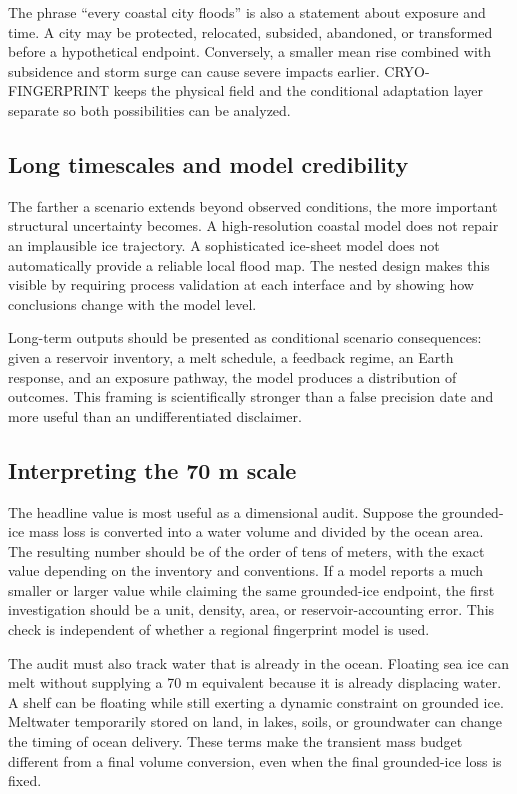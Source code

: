 \documentclass[conference]{IEEEtran}
\begin{document}
The phrase ``every coastal city floods'' is also a statement about exposure and time. A city may be protected, relocated, subsided, abandoned, or transformed before a hypothetical endpoint. Conversely, a smaller mean rise combined with subsidence and storm surge can cause severe impacts earlier. CRYO-FINGERPRINT keeps the physical field and the conditional adaptation layer separate so both possibilities can be analyzed.

\subsection{Long timescales and model credibility}

The farther a scenario extends beyond observed conditions, the more important structural uncertainty becomes. A high-resolution coastal model does not repair an implausible ice trajectory. A sophisticated ice-sheet model does not automatically provide a reliable local flood map. The nested design makes this visible by requiring process validation at each interface and by showing how conclusions change with the model level.

Long-term outputs should be presented as conditional scenario consequences: given a reservoir inventory, a melt schedule, a feedback regime, an Earth response, and an exposure pathway, the model produces a distribution of outcomes. This framing is scientifically stronger than a false precision date and more useful than an undifferentiated disclaimer.

\subsection{Interpreting the 70 m scale}

The headline value is most useful as a dimensional audit. Suppose the grounded-ice mass loss is converted into a water volume and divided by the ocean area. The resulting number should be of the order of tens of meters, with the exact value depending on the inventory and conventions. If a model reports a much smaller or larger value while claiming the same grounded-ice endpoint, the first investigation should be a unit, density, area, or reservoir-accounting error. This check is independent of whether a regional fingerprint model is used.

The audit must also track water that is already in the ocean. Floating sea ice can melt without supplying a 70 m equivalent because it is already displacing water. A shelf can be floating while still exerting a dynamic constraint on grounded ice. Meltwater temporarily stored on land, in lakes, soils, or groundwater can change the timing of ocean delivery. These terms make the transient mass budget different from a final volume conversion, even when the final grounded-ice loss is fixed.
\end{document}
